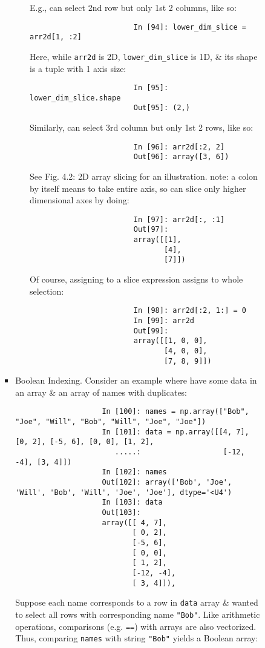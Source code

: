 \documentclass{article}
\begin{document}
\begin{enumerate}
\begin{itemize}
\begin{itemize}
\begin{itemize}
\begin{itemize}
					E.g., can select 2nd row but only 1st 2 columns, like so:
					\begin{verbatim}
						In [94]: lower_dim_slice = arr2d[1, :2]
					\end{verbatim}
					Here, while {\tt arr2d} is 2D, \verb|lower_dim_slice| is 1D, \& its shape is a tuple with 1 axis size:
					\begin{verbatim}
						In [95]: lower_dim_slice.shape
						Out[95]: (2,)
					\end{verbatim}
					Similarly, can select 3rd column but only 1st 2 rows, like so:
					\begin{verbatim}
						In [96]: arr2d[:2, 2]
						Out[96]: array([3, 6])
					\end{verbatim}
					See {\sf Fig. 4.2: 2D array slicing} for an illustration. note: a colon by itself means to take entire axis, so can slice only higher dimensional axes by doing:
					\begin{verbatim}
						In [97]: arr2d[:, :1]
						Out[97]:
						array([[1],
						       [4],
						       [7]])
					\end{verbatim}
					Of course, assigning to a slice expression assigns to whole selection:
					\begin{verbatim}
						In [98]: arr2d[:2, 1:] = 0
						In [99]: arr2d
						Out[99]:
						array([[1, 0, 0],
						       [4, 0, 0],
						       [7, 8, 9]])
					\end{verbatim}
				\end{itemize}
				\item {\sf Boolean Indexing.} Consider an example where have some data in an array \& an array of names with duplicates:
				\begin{verbatim}
					In [100]: names = np.array(["Bob", "Joe", "Will", "Bob", "Will", "Joe", "Joe"])
					In [101]: data = np.array([[4, 7], [0, 2], [-5, 6], [0, 0], [1, 2],
					   .....:                   [-12, -4], [3, 4]])
					In [102]: names
					Out[102]: array(['Bob', 'Joe', 'Will', 'Bob', 'Will', 'Joe', 'Joe'], dtype='<U4')
					In [103]: data
					Out[103]:
					array([[ 4, 7],
						   [ 0, 2],
						   [-5, 6],
						   [ 0, 0],
						   [ 1, 2],
						   [-12, -4],
						   [ 3, 4]]),
				\end{verbatim}
				Suppose each name corresponds to a row in {\tt data} array \& wanted to select all rows with corresponding name {\tt"Bob"}. Like arithmetic operations, comparisons (e.g. {\tt==}) with arrays are also vectorized. Thus, comparing {\tt names} with string {\tt"Bob"} yields a Boolean array:

\end{itemize}
\end{itemize}
\end{itemize}
\end{enumerate}
\end{document}
